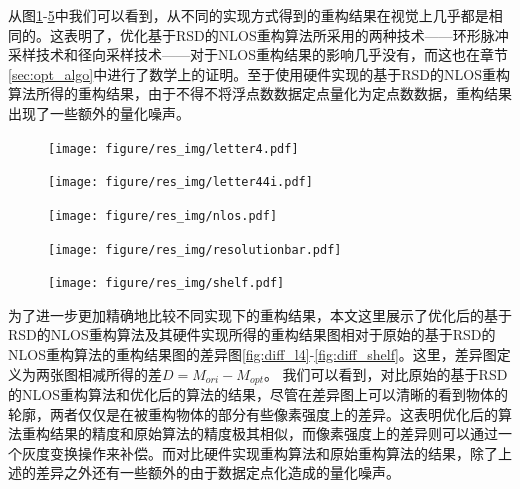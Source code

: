 \documentclass[master]{shtthesis}             %
\begin{document}
从图\ref{fig:letter4}-\ref{fig:shelf}中我们可以看到，从不同的实现方式得到的重构结果在视觉上几乎都是相同的。这表明了，优化基于RSD的NLOS重构算法所采用的两种技术——环形脉冲采样技术和径向采样技术——对于NLOS重构结果的影响几乎没有，而这也在章节\ref{sec:opt_algo}中进行了数学上的证明。至于使用硬件实现的基于RSD的NLOS重构算法所得的重构结果，由于不得不将浮点数数据定点量化为定点数数据，重构结果出现了一些额外的量化噪声。
\begin{figure}[htbp]
  \centering
  \texttt{[image: figure/res\_img/letter4.pdf]}
  \label{fig:letter4}
\end{figure}

\begin{figure}[htbp]
  \centering
  \texttt{[image: figure/res\_img/letter44i.pdf]}
  \label{fig:letter44i}
\end{figure}

\begin{figure}[htbp]
  \centering
  \texttt{[image: figure/res\_img/nlos.pdf]}
  \label{fig:nlos}
\end{figure}

\begin{figure}[htbp]
  \centering
  \texttt{[image: figure/res\_img/resolutionbar.pdf]}
  \label{fig:resolutionbar}
\end{figure}

\begin{figure}[htbp]
  \centering
  \texttt{[image: figure/res\_img/shelf.pdf]}
  \label{fig:shelf}
\end{figure}

为了进一步更加精确地比较不同实现下的重构结果，本文这里展示了优化后的基于RSD的NLOS重构算法及其硬件实现所得的重构结果图相对于原始的基于RSD的NLOS重构算法的重构结果图的差异图\ref{fig:diff_l4}-\ref{fig:diff_shelf}。这里，差异图定义为两张图相减所得的差$D=M_{ori}-M_{opt}$。
我们可以看到，对比原始的基于RSD的NLOS重构算法和优化后的算法的结果，尽管在差异图上可以清晰的看到物体的轮廓，两者仅仅是在被重构物体的部分有些像素强度上的差异。这表明优化后的算法重构结果的精度和原始算法的精度极其相似，而像素强度上的差异则可以通过一个灰度变换操作来补偿。而对比硬件实现重构算法和原始重构算法的结果，除了上述的差异之外还有一些额外的由于数据定点化造成的量化噪声。
\end{document}
